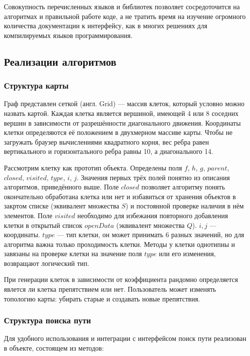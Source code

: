 Совокупность перечисленных языков и библиотек позволяет сосредоточится на алгоритмах и правильной работе коде, а не тратить время на изучение огромного количества документации к интерфейсу, как в многих решениях для компилируемых языков программирования.
\subsection{Реализации алгоритмов}
\subsubsection{Структура карты}
Граф представлен сеткой (англ. Grid) — массив клеток, который условно можно назвать картой. Каждая клетка является вершиной, имеющей 4 или 8 соседних вершин в зависимости от разрешённости диагонального движения. Координаты клетки определяются её положением в двухмерном массиве карты. Чтобы не загружать браузер вычислениями квадратного корня, вес ребра равен вертикального и горизонтального ребра равны 10, а диагонального 14.

Рассмотрим клетку как прототип объекта. Определены поля $f$, $h$, $g$, $parent$, $closed$, $visited$, $type$, $i$, $j$. Значения первых трёх полей понятно из описания алгоритмов, приведённого выше. Поле $closed$ позволяет алгоритму понять окончательно обработана клетка или нет и избавиться от хранения объектов в закртом списке (эквивалент множества $S$) и постоянной проверке наличия в нём элементов. Поле $visited$ необходимо для избежания повторного добавления клетки в открытый список $openData$ (эквивалент множества $Q$). $i,j$ — координаты. $type$ — тип клетки, он может принимать 6 разных значений, но для алгоритма важна только проходимость клетки. Методы у клетки однотипны и завязаны на проверке клетки на значение поля $type$ или его изменения, возвращают логический тип. 

При генерации клеток в зависимости от коэффициента рандомно определяется явлется ли клетка препятствием или нет. Пользователь может изменять топологию карты: убирать старые и создавать новые препятствия.

\subsubsection{Структура поиска пути}
Для удобного использования и интеграции с интерфейсом поиск пути реализован в объекте, состоящем из методов:

